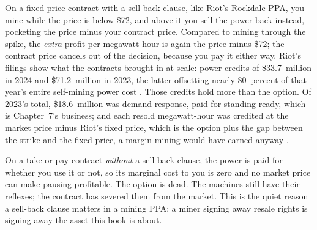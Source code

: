 On a fixed-price contract with a sell-back clause, like Riot's Rockdale PPA, you mine while the price is below \$72, and above it you sell the power back instead, pocketing the price minus your contract price. Compared to mining through the spike, the \emph{extra} profit per megawatt-hour is again the price minus \$72; the contract price cancels out of the decision, because you pay it either way. Riot's filings show what the contracts brought in at scale: power credits of \$33.7~million in 2024 and \$71.2~million in 2023, the latter offsetting nearly 80~percent of that year's entire self-mining power cost \autocite{riot10k2024}. %
Those credits hold more than the option. Of 2023's total, \$18.6~million was demand response, paid for standing ready, which is Chapter~7's business; and each resold megawatt-hour was credited at the market price minus Riot's fixed price, which is the option plus the gap between the strike and the fixed price, a margin mining would have earned anyway \autocite{riot10k2024}. %

On a take-or-pay contract \emph{without} a sell-back clause, the power is paid for whether you use it or not, so its marginal cost to you is zero and no market price can make pausing profitable. The option is dead. The machines still have their reflexes; the contract has severed them from the market. This is the quiet reason a sell-back clause matters in a mining PPA: a miner signing away resale rights is signing away the asset this book is about.

